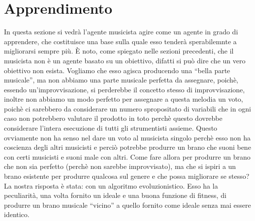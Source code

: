 \section{Apprendimento}

In questa sezione si vedrà l'agente musicista agire come un agente in grado di apprendere, che costituisce una base sulla quale esso tenderà sperabilemnte a migliorarsi sempre più.
È noto, come spiegato nelle sezioni precedenti, che il musicista non è un agente basato su un obiettivo, difatti si può dire che un vero obiettivo non esista.
Vogliamo che esso agisca producendo una ``bella parte musicale'', ma non abbiamo una parte musicale perfetta da assegnare, poichè, essendo un'improvvisazione, si perderebbe il concetto stesso di improvvisazione, inoltre non abbiamo un modo perfetto per assegnare a questa melodia un voto, poichè ci sarebbero da considerare un numero spropositato di variabili che in ogni caso non potrebbero valutare il prodotto in toto perchè questo dovrebbe considerare l'intera esecuzione di tutti gli strumentisti assieme.
Questo ovviamente non ha senso nel dare un voto al musicista singolo perchè esso non ha coscienza degli altri musicisti e perciò potrebbe produrre un brano che suoni bene con certi musicisti e suoni male con altri.
Come fare allora per produrre un brano che non sia perfetto (perchè non sarebbe improvvisato), ma che si ispiri a un brano esistente per produrre qualcosa sul genere e che possa migliorare se stesso?
\newline
La nostra risposta è stata: con un algoritmo evoluzionistico.
Esso ha la peculiarità, una volta fornito un ideale e una buona funzione di fitness, di produrre un brano musicale ``vicino'' a quello fornito come ideale senza mai essere identico.

